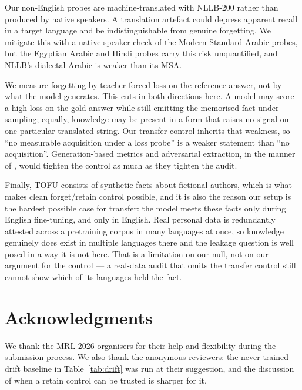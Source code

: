 \documentclass[11pt]{article}
\begin{document}
Our non-English probes are machine-translated with NLLB-200
\citep{nllbteam2022nllb} rather than produced by native speakers. A translation
artefact could depress apparent recall in a target language and be
indistinguishable from genuine forgetting. We mitigate this with a
native-speaker check of the Modern Standard Arabic probes, but the Egyptian
Arabic and Hindi probes carry this risk unquantified, and NLLB's dialectal
Arabic is weaker than its MSA.

We measure forgetting by teacher-forced loss on the reference answer, not by
what the model generates. This cuts in both directions here. A model may
score a high loss on the gold answer while still emitting the memorised fact
under sampling; equally, knowledge may be present in a form that raises no
signal on one particular translated string. Our transfer control inherits
that weakness, so ``no measurable acquisition under a loss probe'' is a
weaker statement than ``no acquisition''. Generation-based metrics and
adversarial extraction, in the manner of \citet{doshi2024unlearn}, would
tighten the control as much as they tighten the audit.

Finally, TOFU consists of synthetic facts about fictional authors, which is
what makes clean forget/retain control possible, and it is also the reason
our setup is the hardest possible case for transfer: the model meets these
facts only during English fine-tuning, and only in English. Real personal
data is redundantly attested across a pretraining corpus in many languages at
once, so knowledge genuinely does exist in multiple languages there and the
leakage question is well posed in a way it is not here. That is a limitation
on our null, not on our argument for the control — a real-data audit that
omits the transfer control still cannot show which of its languages held the
fact.

\section*{Acknowledgments}

We thank the MRL 2026 organisers for their help and flexibility during the
submission process. We also thank the anonymous reviewers: the never-trained
drift baseline in Table~\ref{tab:drift} was run at their suggestion, and the
discussion of when a retain control can be trusted is sharper for it.


\end{document}
